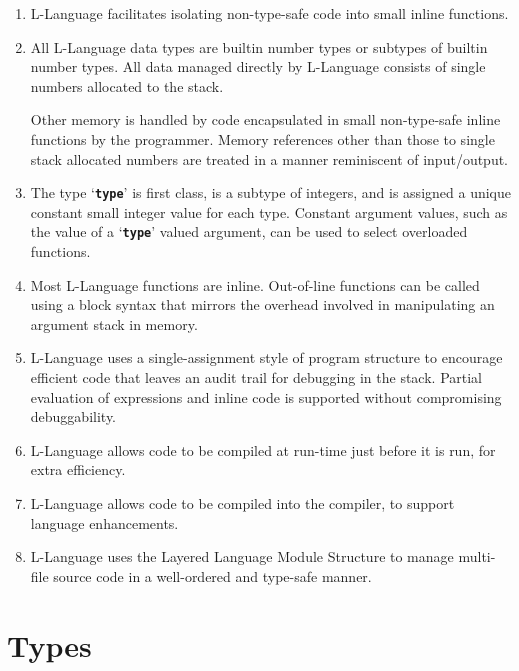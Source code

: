 \documentclass[12pt]{article}
\newcommand{\TT}[1]{{\tt \bfseries #1}}
\begin{document}
\begin{enumerate}

\item
L-Language facilitates isolating non-type-safe code into small inline functions.

\item
All L-Language data types are builtin number types or subtypes of
builtin number types.  All data managed directly by L-Language consists
of single numbers allocated to the stack.

Other memory is handled by code
encapsulated in small non-type-safe inline functions by the programmer.
Memory references other than those to single stack allocated numbers
are treated in a manner reminiscent of input/output.

\item
The type `\TT{type}' is first class, is a subtype of integers, and
is assigned a unique constant small integer value for each type.  Constant
argument values, such as the value of a `\TT{type}' valued
argument, can be used to select overloaded functions.

\item
Most L-Language functions are inline.  Out-of-line functions can be
called using a block syntax that mirrors the overhead involved in
manipulating an argument stack in memory.

\item
L-Language uses a single-assignment style of program structure
to encourage
efficient code that leaves an audit trail for debugging in the stack.
Partial evaluation of expressions and inline code is supported without
compromising debuggability.

\item
L-Language allows code to be compiled at run-time just before
it is run, for extra efficiency.

\item
L-Language allows code to be compiled into the compiler, to support
language enhancements.

\item
L-Language uses the Layered Language Module Structure to manage
multi-file source code in a well-ordered and type-safe manner.


\end{enumerate}


\section{Types}
\label{TYPES}
\end{document}
